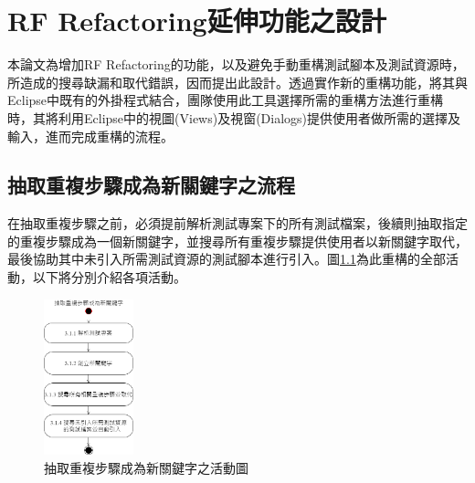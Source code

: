 \chapter{RF Refactoring延伸功能之設計}
\indent
本論文為增加RF Refactoring的功能，以及避免手動重構測試腳本及測試資源時，所造成的搜尋缺漏和取代錯誤，因而提出此設計。透過實作新的重構功能，將其與Eclipse中既有的外掛程式結合，團隊使用此工具選擇所需的重構方法進行重構時，其將利用Eclipse中的視圖(Views)及視窗(Dialogs)提供使用者做所需的選擇及輸入，進而完成重構的流程。

%
\section{抽取重複步驟成為新關鍵字之流程}\label{s3.2}
\indent
在抽取重複步驟之前，必須提前解析測試專案下的所有測試檔案，後續則抽取指定的重複步驟成為一個新關鍵字，並搜尋所有重複步驟提供使用者以新關鍵字取代，最後協助其中未引入所需測試資源的測試腳本進行引入。圖\ref{f3.1}為此重構的全部活動，以下將分別介紹各項活動。

\begin{figure}[H]
    \centering
    \includegraphics[width=0.23\textwidth]{picture/wrap_steps_as_a_new_keyword_activity_diagram.png}
    \caption{抽取重複步驟成為新關鍵字之活動圖}
    \label{f3.1}
\end{figure}

